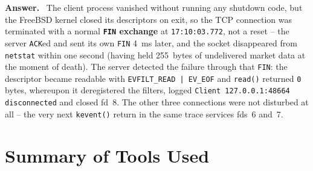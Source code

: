 \documentclass[11pt,a4paper]{article}
\newenvironment{answer}
  {\begin{answerbox}\textbf{\color{accent}Answer.}\ }
  {\end{answerbox}}
\begin{document}
\begin{answer}
The client process vanished without running any shutdown code, but the FreeBSD kernel
closed its descriptors on exit, so the TCP connection was terminated with a normal
\textbf{\texttt{FIN} exchange} at \texttt{17:10:03.772}, not a reset -- the server
\texttt{ACK}ed and sent its own \texttt{FIN} 4~ms later, and the socket disappeared from
\texttt{netstat} within one second (having held 255~bytes of undelivered market data at
the moment of death).  The server detected the failure through that \texttt{FIN}: the
descriptor became readable with \texttt{EVFILT\_READ | EV\_EOF} and \texttt{read()}
returned \texttt{0} bytes, whereupon it deregistered the filters, logged
\texttt{Client 127.0.0.1:48664 disconnected} and closed fd~8.  The other three
connections were not disturbed at all -- the very next \texttt{kevent()} return in the
same trace services fds~6 and~7.
\end{answer}

\section{Summary of Tools Used}
\end{document}
